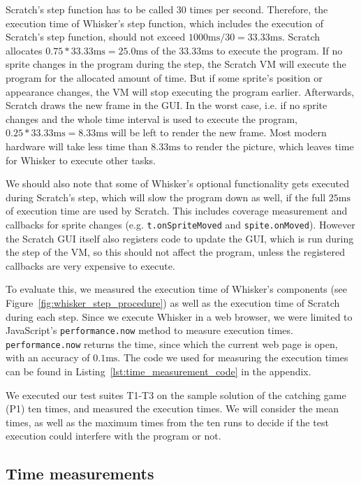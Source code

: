Scratch's step function has to be called 30 times per second.
Therefore, the execution time of Whisker's step function, which includes the execution of Scratch's step function,
should not exceed $1000\text{ms}/30 = 33.33\text{ms}$.
Scratch allocates $0.75 * 33.33\text{ms} = 25.0\text{ms}$ of the $33.33\text{ms}$ to execute the program.
If no sprite changes in the program during the step,
the Scratch VM will execute the program for the allocated amount of time.
But if some sprite's position or appearance changes, the VM will stop executing the program earlier.
Afterwards, Scratch draws the new frame in the GUI.
In the worst case, i.e. if no sprite changes and the whole time interval is used to execute the program,
$0.25 * 33.33\text{ms} = 8.33\text{ms}$ will be left to render the new frame.
Most modern hardware will take less time than $8.33\text{ms}$ to render the picture,
which leaves time for Whisker to execute other tasks.
\parspace

We should also note that some of Whisker's optional functionality gets executed during Scratch's step,
which will slow the program down as well, if the full $25\text{ms}$ of execution time are used by Scratch.
This includes coverage measurement and callbacks for sprite changes (e.g. \texttt{t.onSpriteMoved} and \texttt{spite.onMoved}).
However the Scratch GUI itself also registers code to update the GUI, which is run during the step of the VM,
so this should not affect the program, unless the registered callbacks are very expensive to execute.
\parspace

To evaluate this, we measured the execution time of Whisker's components (see Figure~\ref{fig:whisker_step_procedure})
as well as the execution time of Scratch during each step.
Since we execute Whisker in a web browser,
we were limited to JavaScript's \texttt{performance.now} method to measure execution times.
\texttt{performance.now} returns the time, since which the current web page is open,
with an accuracy of $0.1\text{ms}$.
The code we used for measuring the execution times can be found in Listing~\ref{lst:time_measurement_code} in the appendix.
\parspace

We executed our test suites T1-T3 on the sample solution of the catching game (P1) ten times,
and measured the execution times.
We will consider the mean times, as well as the maximum times from the ten runs
to decide if the test execution could interfere with the program or not.

\subsection{Time measurements}

